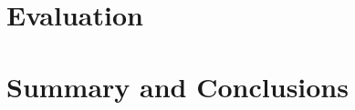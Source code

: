 \documentclass[a4paper,12pt,twoside,openright]{report}
\begin{document}
\chapter{Evaluation} 



\chapter{Summary and Conclusions} 

%




\appendix
\singlespacing

 

\end{document}
